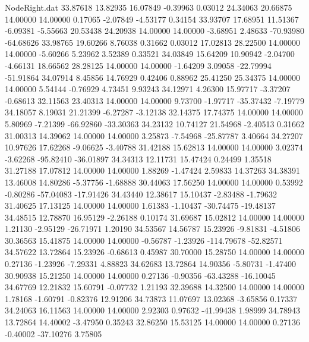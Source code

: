 \begin{filecontents}{NodeRight.dat}
  33.87618   13.82935   16.07849    -0.39963    0.03012   24.34063   20.66875   14.00000   14.00000    0.17065   -2.07849   -4.53177    0.34154
  33.93707   17.68951   11.51367    -6.09381   -5.55663   20.53438   24.20938   14.00000   14.00000   -3.68951    2.48633  -70.93980  -64.68626
  33.98765   19.60266    8.76038     0.31662    0.03012   17.02813   28.22500   14.00000   14.00000   -5.60266    5.23962    3.52389    0.33521
  34.03849   15.64209   10.90942    -2.04700   -4.66131   18.66562   28.28125   14.00000   14.00000   -1.64209    3.09058  -22.79994  -51.91864
  34.07914    8.45856   14.76929     0.42406    0.88962   25.41250   25.34375   14.00000   14.00000    5.54144   -0.76929    4.73451    9.93243
  34.12971    4.26300   15.97717    -3.37207   -0.68613   32.11563   23.40313   14.00000   14.00000    9.73700   -1.97717  -35.37432   -7.19779
  34.18057    8.19031   21.21399    -6.27287   -3.12138   32.14375   17.74375   14.00000   14.00000    5.80969   -7.21399  -66.92860  -33.30363
  34.23132   10.74127   21.54968    -2.40513    0.31662   31.00313   14.39062   14.00000   14.00000    3.25873   -7.54968  -25.87787    3.40664
  34.27207   10.97626   17.62268    -9.06625   -3.40788   31.42188   15.62813   14.00000   14.00000    3.02374   -3.62268  -95.82410  -36.01897
  34.34313   12.11731   15.47424     0.24499    1.35518   31.27188   17.07812   14.00000   14.00000    1.88269   -1.47424    2.59833   14.37263
  34.38391   13.46008   14.80286    -5.37756   -1.68888   30.44063   17.56250   14.00000   14.00000    0.53992   -0.80286  -57.04083  -17.91426
  34.43440   12.38617   15.10437    -2.83488   -1.79632   31.40625   17.13125   14.00000   14.00000    1.61383   -1.10437  -30.74475  -19.48137
  34.48515   12.78870   16.95129    -2.26188    0.10174   31.69687   15.02812   14.00000   14.00000    1.21130   -2.95129  -26.71971    1.20190
  34.53567   14.56787   15.23926    -9.81831   -4.51806   30.36563   15.41875   14.00000   14.00000   -0.56787   -1.23926 -114.79678  -52.82571
  34.57622   13.72864   15.23926    -0.68613    0.45987   30.70000   15.28750   14.00000   14.00000    0.27136   -1.23926   -7.29331    4.88823
  34.62683   13.72864   14.90356    -5.80731   -1.47400   30.90938   15.21250   14.00000   14.00000    0.27136   -0.90356  -63.43288  -16.10045
  34.67769   12.21832   15.60791    -0.07732    1.21193   32.39688   14.32500   14.00000   14.00000    1.78168   -1.60791   -0.82376   12.91206
  34.73873   11.07697   13.02368    -3.65856    0.17337   34.24063   16.11563   14.00000   14.00000    2.92303    0.97632  -41.99438    1.98999
  34.78943   13.72864   14.40002    -3.47950    0.35243   32.86250   15.53125   14.00000   14.00000    0.27136   -0.40002  -37.10276    3.75805

\end{filecontents}
